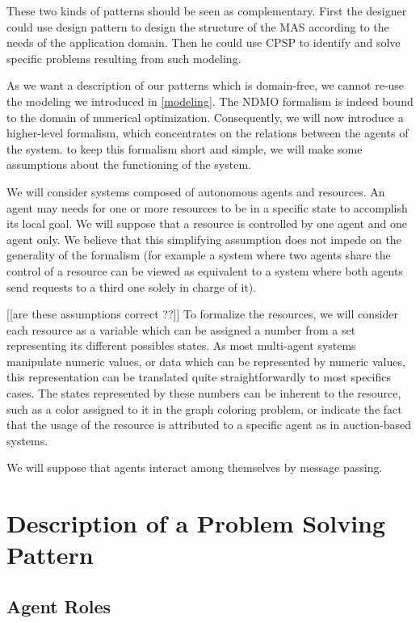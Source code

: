 These two kinds of patterns should be seen as complementary. First the designer could use design pattern to design the structure of the MAS according to the needs of the application domain. Then he could use CPSP to identify and solve specific problems resulting from such modeling.

As we want a description of our patterns which is domain-free, we cannot re-use the modeling we introduced in \ref{modeling}. The NDMO formalism is indeed bound to the domain of numerical optimization. Consequently, we will now introduce a higher-level formalism, which concentrates on the relations between the agents of the system. to keep this formalism short and simple, we will make some assumptions about the functioning of the system.

We will consider systems composed of autonomous agents and resources. An agent may needs for one or more resources to be in a specific state to accomplish its local goal. We will suppose that a resource is controlled by one agent and one agent only. We believe that this simplifying assumption does not impede on the generality of the formalism (for example a system where two agents share the control of a resource can be viewed as equivalent to a system where both agents send requests to a third one solely in charge of it).

[[are these assumptions correct ??]]
To formalize the resources, we will consider each resource as a variable which can be assigned a number from a set representing its different possibles states. As most multi-agent systems manipulate numeric values, or data which can be represented by numeric values, this representation can be translated quite straightforwardly to most specifics cases.
The states represented by these numbers can be inherent to the resource, such as a color assigned to it in the graph coloring problem, or indicate the fact that the usage of the resource is attributed to a specific agent as in auction-based systems.

We will suppose that agents interact among themselves by message passing.

\section{Description of a Problem Solving Pattern}

\subsection{Agent Roles}\label{CPSP_roles}

